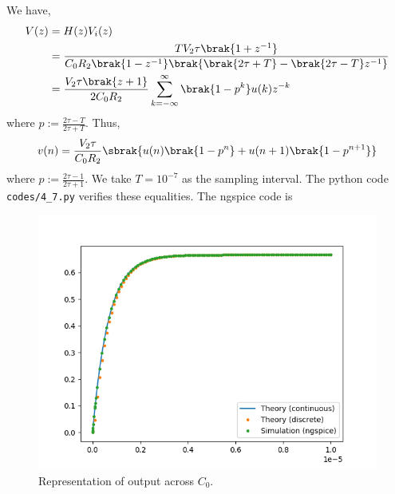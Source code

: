 \documentclass[journal,12pt,twocolumn]{IEEEtran}
\renewcommand\thesection{\arabic{section}}
\begin{document}
\begin{enumerate}[label=\arabic*.,ref=\thesection.\theenumi]
\solution We have,
\begin{align}
    V(z) &= H(z)V_i(z) \\
         &= \frac{TV_2\tau\brak{1+z^{-1}}}{C_0R_2\brak{1-z^{-1}}\brak{\brak{2\tau+T}-\brak{2\tau-T}z^{-1}}} \\
         &= \frac{V_2\tau\brak{z+1}}{2C_0R_2}\sum_{k=-\infty}^{\infty}\brak{1-p^k}u(k)z^{-k}
\end{align}
where $p := \frac{2\tau-T}{2\tau+T}$. Thus,
\begin{align}
    v(n) = \frac{V_2\tau}{C_0R_2}\sbrak{u(n)\brak{1-p^n}+u(n+1)\brak{1-p^{n+1}}}
\end{align}
where $p := \frac{2\tau-1}{2\tau+1}$. We take $T = 10^{-7}$ as the
sampling interval. The python code \texttt{codes/4\_7.py} verifies
these equalities.
\vspace*{4em}
The ngspice code is

\begin{figure}
    \includegraphics[width=\columnwidth]{figs/4_7.png}
    \caption{Representation of output across $C_0$.}
    \label{fig:vc0}
\end{figure}
\end{enumerate}
\end{document}
